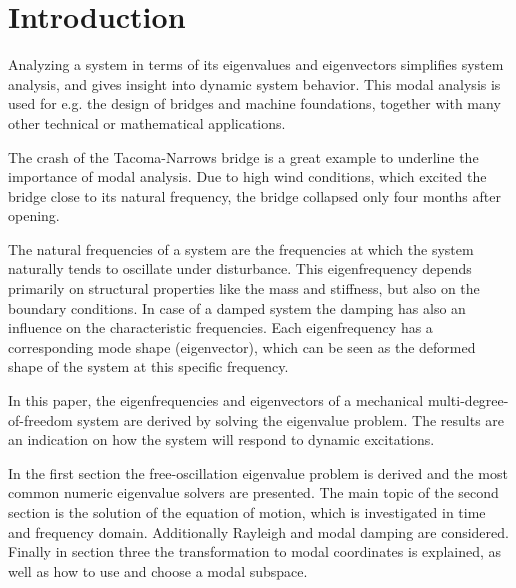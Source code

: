 \documentclass[conference]{journal}
\begin{document}
	\section{Introduction}
	Analyzing a system in terms of its eigenvalues and eigenvectors simplifies system analysis, and gives insight into dynamic system behavior.
	This modal analysis is used for e.g. the design of bridges and machine foundations, together with many other technical or mathematical applications. 
	
	The crash of the Tacoma-Narrows bridge is a great example to underline the importance of modal analysis. Due to high wind conditions, which excited the bridge close to its natural frequency, the bridge collapsed only four months after opening. 

	The natural frequencies of a system are the frequencies at which the system naturally tends to oscillate under disturbance. This  eigenfrequency depends primarily on structural properties like the mass and stiffness, but also on the boundary conditions. In case of a damped system the damping has also an influence on the characteristic frequencies. Each eigenfrequency has a corresponding mode shape (eigenvector), which can be seen as the deformed shape of the system at this specific frequency. 
	
	In this paper, the eigenfrequencies and eigenvectors of a mechanical multi-degree-of-freedom system are derived by solving the eigenvalue problem. The results are an indication on how the system will respond to dynamic excitations.
	
	In the first section the free-oscillation eigenvalue problem is derived and the most common numeric eigenvalue solvers are presented. The main topic of the second section is the solution of the equation of motion, which is investigated in time and frequency domain. Additionally Rayleigh and modal damping are considered. Finally in section three the transformation to modal coordinates is explained, as well as how to use and choose a modal subspace.
	
\end{document}
